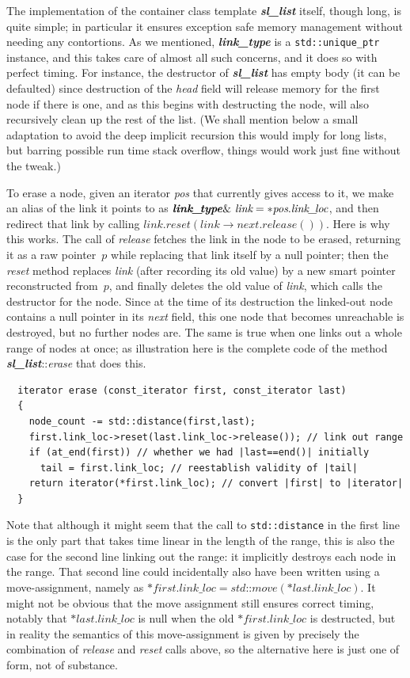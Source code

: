 \documentclass[12pt]{article}
\theoremstyle{plain}
\theoremstyle{definition}
\newcommand\std[1]{\texttt{std::#1}}
\def\uptr.{\std{unique\_ptr}}
\def\lnkt.{\textbf{\textit{link\_\!type}}}
\def\lnlc.{\textit{link\_\!loc}}
\def\slls.{\textbf{\textit{sl\_\!list}}}
\begin{document}
The implementation of the container class template \slls. itself, though long,
is quite simple; in particular it ensures exception safe memory management
without needing any contortions. As we mentioned, \lnkt. is a \uptr. instance,
and this takes care of almost all such concerns, and it does so with perfect
timing. For instance, the destructor of \slls. has empty body (it can be
defaulted) since destruction of the \textit{head} field will release memory for
the first node if there is one, and as this begins with destructing the node,
will also recursively clean up the rest of the list. (We shall mention below a
small adaptation to avoid the deep implicit recursion this would imply for long
lists, but barring possible run time stack overflow, things would work just fine
without the tweak.)

To erase a node, given an iterator \textit{pos} that currently gives access to
it, we make an alias of the link it points to as
$\lnkt.\&~\textit{link}={*}\textit{pos}.\lnlc.$, and then redirect that link by
calling $\textit{link}.\textit{reset}
(\textit{link}\to\textit{next}.\textit{release}())$. Here is why this works. The
call of \textit{release} fetches the link in the node to be erased, returning it
as a raw pointer~$p$ while replacing that link itself by a null pointer; then
the \textit{reset} method replaces \textit{link} (after recording its old value)
by a new smart pointer reconstructed from~$p$, and finally deletes the old value
of \textit{link}, which calls the destructor for the node. Since at the time of
its destruction the linked-out node contains a null pointer in its \textit{next}
field, this one node that becomes unreachable is destroyed, but no further nodes
are. The same is true when one links out a whole range of nodes at once; as
illustration here is the complete code of the method \slls.::\textit{erase} that
does this.
\begin{verbatim}
  iterator erase (const_iterator first, const_iterator last)
  {
    node_count -= std::distance(first,last);
    first.link_loc->reset(last.link_loc->release()); // link out range
    if (at_end(first)) // whether we had |last==end()| initially
      tail = first.link_loc; // reestablish validity of |tail|
    return iterator(*first.link_loc); // convert |first| to |iterator|
  }
\end{verbatim}
Note that although it might seem that the call to \std{distance} in the first
line is the only part that takes time linear in the length of the range, this is
also the case for the second line linking out the range: it implicitly destroys
each node in the range. That second line could incidentally also have been
written using a move-assignment, namely as $*\textit{first}.\textit{link\_loc}
=\textit{std::move}(*\textit{last}.\textit{link\_loc})$. It might not be obvious
that the move assignment still ensures correct timing, notably that
$*\textit{last}.\textit{link\_loc}$ is null when the old
$*\textit{first}.\textit{link\_loc}$ is destructed, but in reality the semantics
of this move-assignment is given by precisely the combination of
\textit{release} and \textit{reset} calls above, so the alternative here is just
one of form, not of substance.
\end{document}
